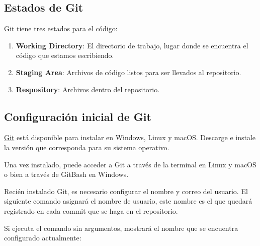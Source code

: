 \subsection{Estados de Git}

Git tiene tres estados para el código:

\begin{enumerate}
\item
  \textbf{Working Directory}: El directorio de trabajo, lugar donde se
  encuentra el código que estamos escribiendo.
\item
  \textbf{Staging Area}: Archivos de código listos para ser llevados al
  repositorio.
\item
  \textbf{Respository}: Archivos dentro del repositorio.
\end{enumerate}

\subsection{Configuración inicial de Git}

\href{https://git-scm.com/}{Git} está disponible para instalar en
Windows, Linux y macOS. Descarge e instale la versión que corresponda
para su sistema operativo.

Una vez instalado, puede acceder a Git a través de la terminal en Linux
y macOS o bien a través de GitBash en Windows.

Recién instalado Git, es necesario configurar el nombre y correo del
usuario. El siguiente comando asignará el nombre de usuario, este nombre
es el que quedará registrado en cada commit que se haga en el
repositorio.

\begin{Shaded}
\begin{Highlighting}[]
    \ExtensionTok{$}
\end{Highlighting}
\end{Shaded}

Si ejecuta el comando sin argumentos, mostrará el nombre que se
encuentra configurado actualmente:

\begin{Shaded}
\begin{Highlighting}[]
    \ExtensionTok{$}
\end{Highlighting}
\end{Shaded}

